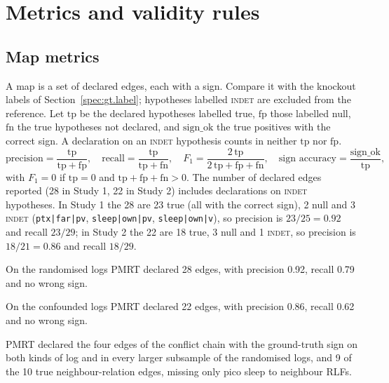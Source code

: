 \section{Metrics and validity rules}
\label{spec:met}

\subsection{Map metrics}
\label{spec:met.map}

A map is a set of declared edges, each with a sign. Compare it with the knockout labels of Section~\ref{spec:gt.label}; hypotheses labelled \textsc{indet} are excluded from the reference. Let $\mathrm{tp}$ be the declared hypotheses labelled true, $\mathrm{fp}$ those labelled null, $\mathrm{fn}$ the true hypotheses not declared, and $\mathrm{sign\_ok}$ the true positives with the correct sign. A declaration on an \textsc{indet} hypothesis counts in neither $\mathrm{tp}$ nor $\mathrm{fp}$.
\begin{equation*}
\text{precision} = \frac{\mathrm{tp}}{\mathrm{tp} + \mathrm{fp}}, \quad
\text{recall} = \frac{\mathrm{tp}}{\mathrm{tp} + \mathrm{fn}}, \quad
F_1 = \frac{2\,\mathrm{tp}}{2\,\mathrm{tp} + \mathrm{fp} + \mathrm{fn}}, \quad
\text{sign accuracy} = \frac{\mathrm{sign\_ok}}{\mathrm{tp}},
\end{equation*}
with $F_1 = 0$ if $\mathrm{tp} = 0$ and $\mathrm{tp} + \mathrm{fp} + \mathrm{fn} > 0$. The number of declared edges reported (28 in Study 1, 22 in Study 2) includes declarations on \textsc{indet} hypotheses. In Study 1 the 28 are 23 true (all with the correct sign), 2 null and 3 \textsc{indet} (\texttt{ptx|far|pv}, \texttt{sleep|own|pv}, \texttt{sleep|own|v}), so precision is $23/25 = 0.92$ and recall $23/29$; in Study 2 the 22 are 18 true, 3 null and 1 \textsc{indet}, so precision is $18/21 = 0.86$ and recall $18/29$.


On the randomised logs PMRT declared 28 edges, with precision 0.92, recall 0.79 and no wrong sign.

On the confounded logs PMRT declared 22 edges, with precision 0.86, recall 0.62 and no wrong sign.

PMRT declared the four edges of the conflict chain with the ground-truth sign on both kinds of log and in every larger subsample of the randomised logs, and 9 of the 10 true neighbour-relation edges, missing only pico sleep to neighbour RLFs.

